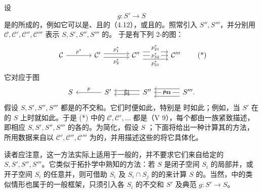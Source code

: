 设
\[
g:S'\longrightarrow S
\]
是的所成的，例如它可以是、且的（4.12），或且的。照常引入 $S'',S'''$，并分别用 $\mathcal C,\mathcal C',\mathcal C'',\mathcal C'''$ 表示 $S,S',S'',S'''$ 的。
于是有下列 2-的图：
\[
\begin{tikzcd}[column sep=large]
\mathcal C\arrow[r,"p^*"]&\mathcal C'\arrow[r,shift left=.6ex,"p_1^*"]\arrow[r,shift right=.6ex,"p_2^*"']&\mathcal C''\arrow[r,shift left=1.2ex,"p_{21}^*"]\arrow[r,"p_{32}^*" description]\arrow[r,shift right=1.2ex,"p_{31}^*"']&\mathcal C'''
\end{tikzcd}\tag{*}
\]
它对应于图
\[
\begin{tikzcd}[column sep=large]
S&S'\arrow[l,"p"']&S''\arrow[l,shift left=.6ex,"p_1"']\arrow[l,shift right=.6ex,"p_2"]&S'''\arrow[l,shift left=1.2ex,"p_{21}"']\arrow[l,"p_{32}" description]\arrow[l,shift right=1.2ex,"p_{31}"] .
\end{tikzcd}
\]
假设 $S,S',S'',S'''$ 都是的不交和。它们时便如此，特别是 时如此；例如，当 $S'$ 在 的 $S$ 上时就如此。于是 (*) 中的 $\mathcal C,\mathcal C',\ldots$ 都是（V 9），每个都由一族紧致描述，即相应 $S,S',S'',S'''$ 的各的。为简化，假设 $S$ ；下面将给出一种计算其的方法，所用数据来自以 $\mathcal C',\mathcal C'',\mathcal C'''$ 为的，并用描述这些的将它具体化。

读者应注意，这一方法实际上适用于一般的，并不要求它们来自给定的 $S,S',S'',S'''$。它类似于拓扑学中熟知的方法：若 $S$ 是闭子空间 $S_i$ 的局部并，或开子空间 $S_i$ 的任意并，则可借助 $S_i$ 及 $S_i\cap S_j$ 的的来计算 $S$ 的。当然，中的类似情形也属于的一般框架，只须引入各 $S_i$ 的不交和 $S'$ 及典范 $g:S'\to S$。


